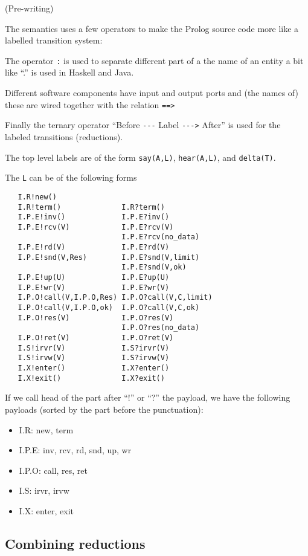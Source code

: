 (Pre-writing)

The semantics uses a few operators to make the Prolog source code more
like a labelled transition system:

The operator \verb+:+ is used to separate different part of a the name of
an entity a bit like ``.'' is used in Haskell and Java.

Different software components have input and output ports and (the
names of) these are wired together with the relation \verb+==>+

Finally the ternary operator ``Before \verb+---+ Label \verb+--->+
After'' is used for the labeled transitions (reductions).

The top level labels are of the form \verb+say(A,L)+,
\verb+hear(A,L)+, and \verb+delta(T)+.

The \verb+L+ can be of the following forms

\begin{verbatim}
   I.R!new()
   I.R!term()              I.R?term()
   I.P.E!inv()             I.P.E?inv()
   I.P.E!rcv(V)            I.P.E?rcv(V)
                           I.P.E?rcv(no_data)
   I.P.E!rd(V)             I.P.E?rd(V)
   I.P.E!snd(V,Res)        I.P.E?snd(V,limit)
                           I.P.E?snd(V,ok)
   I.P.E!up(U)             I.P.E?up(U)
   I.P.E!wr(V)             I.P.E?wr(V)
   I.P.O!call(V,I.P.O,Res) I.P.O?call(V,C,limit)
   I.P.O!call(V,I.P.O,ok)  I.P.O?call(V,C,ok)
   I.P.O!res(V)            I.P.O?res(V)
                           I.P.O?res(no_data)
   I.P.O!ret(V)            I.P.O?ret(V)
   I.S!irvr(V)             I.S?irvr(V)
   I.S!irvw(V)             I.S?irvw(V)
   I.X!enter()             I.X?enter()
   I.X!exit()              I.X?exit()
\end{verbatim}

If we call head of the part after ``!'' or ``?'' the payload, we have
the following payloads (sorted by the part before the punctuation):

\begin{itemize}
\item I.R:   new, term
\item I.P.E: inv, rcv, rd, snd, up, wr
\item I.P.O: call, res, ret
\item I.S:   irvr, irvw
\item I.X:   enter, exit
\end{itemize}

\subsection{Combining reductions}


